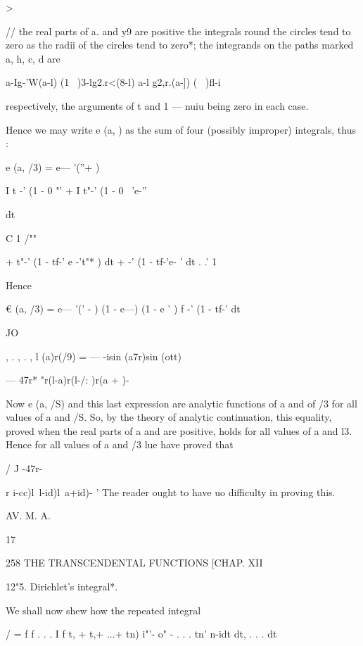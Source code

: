 >  




// the real parts of a. and y9 are positive the integrals round the circles 
tend to zero as the radii of the circles tend to zero*; the integrands on the 
paths marked a, h, c, d are 

 a-Ig-'W(a-l) (1 \   )3-lg2.r<(8-l) a-l g2,r.(a-]) (  \   )fl-i 

respectively, the arguments of t and 1 —   nuiu being zero in each case. 

Hence we may write e (a,  ) as the sum of four (possibly improper) 
integrals, thus : 



e (a, /3) = e— '(''+ ) 



I t -' (1 - 0 "'   + I t"-' (1 - 0 ~'e-'' 



 dt 



C 1 /"" 

+ t"-' (1 - tf-' e -'t"* ) dt +   -' (1 - tf-'e- ' dt 
. .' 1 

Hence 

€ (a, /3) = e— '(' - ) (1 - e---) (1 - e ' ) f   -' (1 - tf-' dt 

JO 

, .   , .  , l (a)r(/9) 
= — -isin (a7r)sin (ott)    ~ 

— 47r* 
"r(l-a)r(l-/: )r(a +  )- 

Now e (a, /S) and this last expression are analytic functions of a and of /3 
for all values of a and /S. So, by the theory of analytic continuation, this 
equality, proved when the real parts of a and   are positive, holds for all 
values of a and l3. Hence for all values of a and /3 lue have proved that 

/ J  -47r- 



r i-cc)l\ l-id)l\ a+id)- 
' The reader ought to have uo difficulty in proving this. 



AV. M. A. 



17 



258 THE TRANSCENDENTAL FUNCTIONS [CHAP. XII 

12"5. Dirichlet's integral*. 

We shall now shew how the repeated integral 

/ = f f . . . I f t, + t,+ ...+ tn)  i"'- o" -  . . . tn' n-idt dt, . . . dt  

